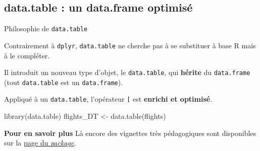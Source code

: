 \documentclass[12pt,ignorenonframetext,handout,]{beamer}
\newenvironment{Shaded}{}{}
\newcommand{\KeywordTok}[1]{\textcolor[rgb]{0.00,0.00,1.00}{#1}}
\newcommand{\NormalTok}[1]{#1}
\newcommand{\StringTok}[1]{\textcolor[rgb]{0.00,0.50,0.50}{#1}}
\renewenvironment{Shaded}{\begin{snugshade}}{\end{snugshade}}
\newcommand{\intertitre}[1]{\textcolor{redInsee}{\textbf{#1}}}
\begin{document}
\hypertarget{data.table-un-data.frame-optimise}{%
\subsection{data.table : un data.frame
optimisé}\label{data.table-un-data.frame-optimise}}

\begin{frame}[fragile]{Philosophie de \texttt{data.table}}
\protect\hypertarget{philosophie-de-data.table}{}

Contrairement à \texttt{dplyr}, \texttt{data.table} ne cherche pas à se
substituer à base R mais à le compléter.

\pause Il introduit un nouveau type d’objet, le \texttt{data.table}, qui
\textbf{hérite} du \texttt{data.frame} (tout \texttt{data.table} est un
\texttt{data.frame}).

\pause Appliqué à un \texttt{data.table}, l’opérateur \texttt{{[}} est
\textbf{enrichi et optimisé}.

\begin{Shaded}
\begin{Highlighting}[]
\KeywordTok{library}\NormalTok{(data.table)}
\NormalTok{flights_DT <-}\StringTok{ }\KeywordTok{data.table}\NormalTok{(flights)}
\end{Highlighting}
\end{Shaded}

\pause

\intertitre{Pour en savoir plus} Là encore des vignettes très
pédagogiques sont disponibles sur la
\href{https://cran.r-project.org/package=data.table}{\underline{page du \textit{package}}}.

\end{frame}
\end{document}
